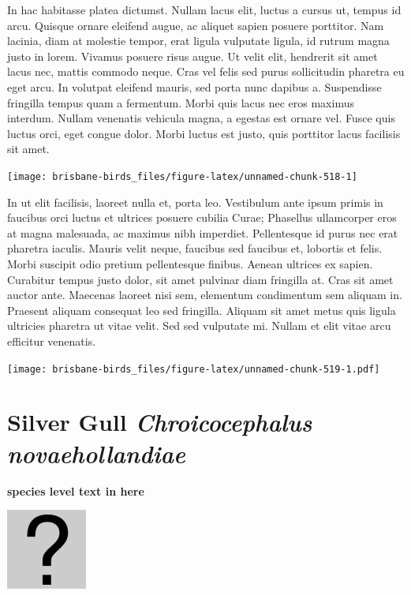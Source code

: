 \documentclass[]{book}
\let\origfigure\figure
\let\endorigfigure\endfigure
\renewenvironment{figure}[1][2] {
  \expandafter\origfigure\expandafter[H]
} {
  \endorigfigure
}
\begin{document}
In hac habitasse platea dictumst. Nullam lacus elit, luctus a cursus ut,
tempus id arcu. Quisque ornare eleifend augue, ac aliquet sapien posuere
porttitor. Nam lacinia, diam at molestie tempor, erat ligula vulputate
ligula, id rutrum magna justo in lorem. Vivamus posuere risus augue. Ut
velit elit, hendrerit sit amet lacus nec, mattis commodo neque. Cras vel
felis sed purus sollicitudin pharetra eu eget arcu. In volutpat eleifend
mauris, sed porta nunc dapibus a. Suspendisse fringilla tempus quam a
fermentum. Morbi quis lacus nec eros maximus interdum. Nullam venenatis
vehicula magna, a egestas est ornare vel. Fusce quis luctus orci, eget
congue dolor. Morbi luctus est justo, quis porttitor lacus facilisis sit
amet.

\begin{figure}
\texttt{[image: brisbane-birds\_files/figure-latex/unnamed-chunk-518-1]} \caption{insert figure caption}\label{fig:unnamed-chunk-518}
\end{figure}

In ut elit facilisis, laoreet nulla et, porta leo. Vestibulum ante ipsum
primis in faucibus orci luctus et ultrices posuere cubilia Curae;
Phasellus ullamcorper eros at magna malesuada, ac maximus nibh
imperdiet. Pellentesque id purus nec erat pharetra iaculis. Mauris velit
neque, faucibus sed faucibus et, lobortis et felis. Morbi suscipit odio
pretium pellentesque finibus. Aenean ultrices ex sapien. Curabitur
tempus justo dolor, sit amet pulvinar diam fringilla at. Cras sit amet
auctor ante. Maecenas laoreet nisi sem, elementum condimentum sem
aliquam in. Praesent aliquam consequat leo sed fringilla. Aliquam sit
amet metus quis ligula ultricies pharetra ut vitae velit. Sed sed
vulputate mi. Nullam et elit vitae arcu efficitur venenatis.

\begin{figure}
\centering
\texttt{[image: brisbane-birds\_files/figure-latex/unnamed-chunk-519-1.pdf]}
\caption{\label{fig:unnamed-chunk-519}insert figure caption}
\end{figure}

\section{\texorpdfstring{Silver Gull \emph{Chroicocephalus
novaehollandiae}}{Silver Gull Chroicocephalus novaehollandiae}}\label{silver-gull-chroicocephalus-novaehollandiae}

\textbf{species level text in here}

\begin{figure}
\centering
\includegraphics{assets/missing.png}
\caption{No image for species}
\end{figure}
\end{document}
